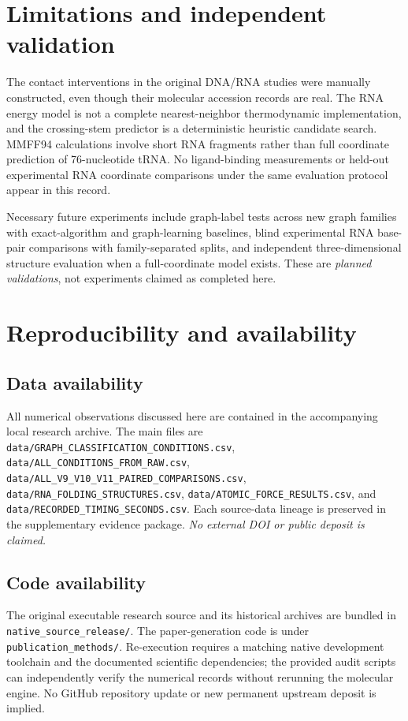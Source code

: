 \documentclass[10pt,a4paper]{article}
\begin{document}
\section{Limitations and independent validation}
The contact interventions in the original DNA/RNA studies were manually constructed, even though their molecular accession records are real. The RNA energy model is not a complete nearest-neighbor thermodynamic implementation, and the crossing-stem predictor is a deterministic heuristic candidate search. MMFF94 calculations involve short RNA fragments rather than full coordinate prediction of 76-nucleotide tRNA. No ligand-binding measurements or held-out experimental RNA coordinate comparisons under the same evaluation protocol appear in this record.

Necessary future experiments include graph-label tests across new graph families with exact-algorithm and graph-learning baselines, blind experimental RNA base-pair comparisons with family-separated splits, and independent three-dimensional structure evaluation when a full-coordinate model exists. These are \emph{planned validations}, not experiments claimed as completed here.

\section{Reproducibility and availability}\subsection{Data availability}
All numerical observations discussed here are contained in the accompanying local research archive. The main files are \texttt{data/GRAPH\_CLASSIFICATION\_CONDITIONS.csv}, \texttt{data/ALL\_CONDITIONS\_FROM\_RAW.csv}, \texttt{data/ALL\_V9\_V10\_V11\_PAIRED\_COMPARISONS.csv}, \texttt{data/RNA\_FOLDING\_STRUCTURES.csv}, \texttt{data/ATOMIC\_FORCE\_RESULTS.csv}, and \texttt{data/RECORDED\_TIMING\_SECONDS.csv}. Each source-data lineage is preserved in the supplementary evidence package. \emph{No external DOI or public deposit is claimed.}
\subsection{Code availability}
The original executable research source and its historical archives are bundled in \texttt{native\_source\_release/}. The paper-generation code is under \texttt{publication\_methods/}. Re-execution requires a matching native development toolchain and the documented scientific dependencies; the provided audit scripts can independently verify the numerical records without rerunning the molecular engine. No GitHub repository update or new permanent upstream deposit is implied.
\end{document}

